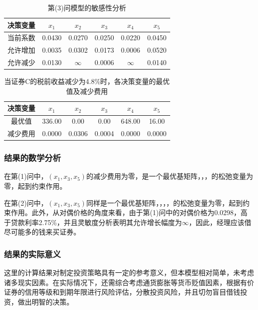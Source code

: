 \documentclass[12pt,a4paper]{article}
\begin{document}
\begin{table}[H]
    \centering
    \caption{第(3)问模型的敏感性分析}
    \label{tab:ex6_sensitivity}
    \begin{tabular}{c|ccccc}
        \toprule
        决策变量 & \(x_1\) & \(x_2\) & \(x_3\) & \(x_4\) &
        \(x_5\)\tabularnewline
        \midrule
        当前系数 & 0.0430 & 0.0270 & 0.0250 & 0.0220 & 0.0450\tabularnewline
        允许增加 & 0.0035 & 0.0302 & 0.0173 & 0.0006 & 0.0520\tabularnewline
        允许减少 & 0.0130 & \(\infty\) & 0.0006 & \(\infty\) &
        0.0140\tabularnewline
        \bottomrule
    \end{tabular}
\end{table}

\begin{table}[H]
    \centering
    \caption{当证券C的税前收益减少为4.8\%时，各决策变量的最优值及减少费用}
    \label{tab:ex6_3_new}
    \begin{tabular}{c|ccccc}
        \toprule
        决策变量 & \(x_1\) & \(x_2\) & \(x_3\) & \(x_4\) &
        \(x_5\)\tabularnewline
        \midrule
        最优值 & 336.00 & 0.00 & 0.00 & 648.00 & 16.00\tabularnewline
        减少费用 & 0.0000 & 0.0306 & 0.0004 & 0.0000 & 0.0000\tabularnewline
        \bottomrule
    \end{tabular}
\end{table}

\subsubsection{结果的数学分析}

在第(1)问中，$(x_1, x_3, x_5)$的减少费用为零，是一个最优基矩阵，，，的松弛变量为零，起到约束作用。

在第(2)问中，$(x_1, x_3, x_5)$同样是一个最优基矩阵，，，，的松弛变量为零，起到约束作用。此外，从对偶价格的角度来看，由于第(1)问中的对偶价格为0.0298，高于贷款利率2.75\%，并且灵敏度分析表明其允许增长幅度为$\infty$，因此，经理应该借尽可能多的钱来买证券。

\subsubsection{结果的实际意义}

这里的计算结果对制定投资策略具有一定的参考意义，但本模型相对简单，未考虑诸多现实因素。在实际情况下，还需综合考虑通货膨胀等货币贬值因素，根据有价证券的信用等级和到期年限进行风险评估，分散投资风险，并且切勿盲目借钱投资，做出明智的决策。
\end{document}
